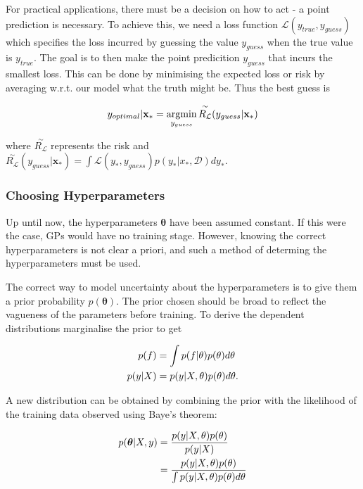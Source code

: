 \documentclass[12pt,a4paper]{report}
\theoremstyle{definition}
\begin{document}
For practical applications, there must be a decision on how to act - a point prediction is necessary. 
To achieve this, we need a loss function $\mathcal{L}(y_{true}, y_{guess})$ which specifies the loss incurred by guessing the value $y_{guess}$ when the true value is $y_{true}$. 
The goal is to then make the point predicition $y_{guess}$ that incurs the smallest loss.
This can be done by minimising the expected loss or risk by averaging w.r.t. our model what the truth might be.
Thus the best guess is 

\begin{equation}
	\centering
	y_{optimal} | \textbf{x}_{*} = \underset{y_{guess}}{\textrm{argmin}} \, \overset{\sim}{R_{\mathcal{L}}}(y_{guess} | \textbf{x}_{*})
\end{equation}

where $\overset{\sim}{R_{\mathcal{L}}}$ represents the risk and $\overset{\sim}{R_{\mathcal{L}}}(y_{guess} | \textbf{x}_{*}) = \int \mathcal{L}(y_{*}, y_{guess}) p(y_{*} | x_{*}, \mathcal{D}) dy_{*}$.

\subsubsection{Choosing Hyperparameters}

Up until now, the hyperparameters $\boldsymbol{\theta}$ have been assumed constant.
If this were the case, GPs would have no training stage. 
However, knowing the correct hyperparameters is not clear a priori, and such a method of determing the hyperparameters must be used.

The correct way to model uncertainty about the hyperparameters is to give them a prior probability $p(\boldsymbol{\theta})$.
The prior chosen should be broad to reflect the vagueness of the parameters before training.
To derive the dependent distributions marginalise the prior to get

\begin{equation}
	\begin{aligned}
		\centering
		p(f) &= \int p(f | \theta) p(\theta) d\theta \\
		p(y | X) &= p(y | X, \theta) p(\theta) d\theta.
	\end{aligned}
\end{equation}

A new distribution can be obtained by combining the prior with the likelihood of the training data observed using Baye's theorem:

\begin{equation}
	\label{eq:ChooseHyper}
	\begin{aligned}
		\centering
		p(\boldsymbol{\theta} | X, y) &= \frac{p(y | X, \theta) p(\theta)}{p(y | X)} \\
		&= \frac{p(y | X, \theta) p(\theta)}{\int p(y | X, \theta) p(\theta) d\theta} 
	\end{aligned}
\end{equation}
\end{document}
